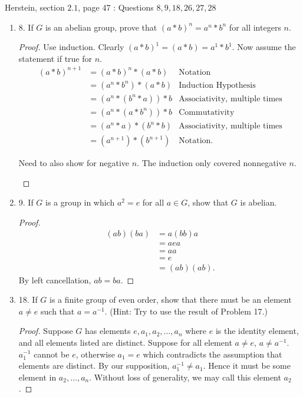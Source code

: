 
Herstein, section $2.1$, page 47 : Questions $8,9,18,26,27,28$
\begin{enumerate}
\item 8. If $G$ is an abelian group, prove that $(a * b)^n=a^n * b^n$ for all integers $n$.
\begin{proof}
Use induction. Clearly $(a*b)^1 = (a*b) = a^1 * b^1$. Now assume the statement if true for  $n$.
\begin{align*}
	(a*b)^{n+1}&= (a*b)^n *(a*b) & \text{Notation} \\
		   &= (a^n * b^n)*(a*b) & \text{Induction Hypothesis} \\
		   &= \left( a^n * (b^n * a) \right)*b & \text{Associativity, multiple times}  \\
		   &= \left( a^n * ( a*b^n) \right)*b & \text{Commutativity}  \\
		   &= (a^n * a)*(b^n*b) & \text{Associativity, multiple times} \\
		   &= (a^{n+1})*(b^{n+1}) & \text{Notation} 
.\end{align*}
\begin{correction}
	Need to also show for negative $n$. The induction only covered nonnegative $n$.
\end{correction}
\end{proof}

\item 9. If $G$ is a group in which $a^2=e$ for all $a \in G$, show that $G$ is abelian.
\begin{proof}
\begin{align*}
	(ab)(ba) &= a (bb) a \\
	&= aea \\
	&= aa \\
	&= e \\
	&= (ab)(ab)
.\end{align*}
By left cancellation, $ab = ba$.
\end{proof}

\item 18. If $G$ is a finite group of even order, show that there must be an element $a \neq e$ such that $a=a^{-1}$. (Hint: Try to use the result of Problem 17.)
\begin{proof}
Suppose $G$ has elements $e, a_1, a_2, \ldots, a_n$ where $e$ is the identity element, and all elements listed are distinct. Suppose for all element $a \neq e$, $a\neq a^{-1}$. $a_1^{-1}$ cannot be $e$, otherwise $a_1 = e$ which contradicts the assumption that elements are distinct. By our supposition, $a_1^{-1}\neq a_1$. Hence it must be some element in $a_2, \ldots, a_n$. Without loss of generality, we may call this element $a_2$.


\end{proof}
\end{enumerate}
